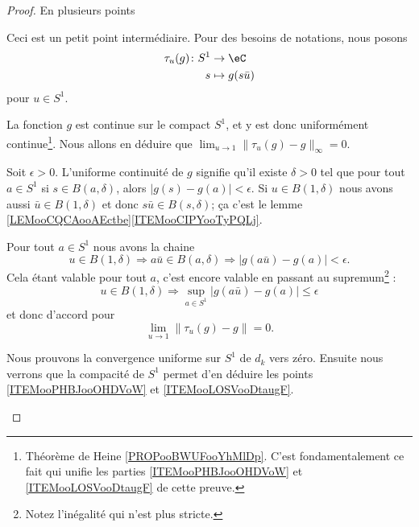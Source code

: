 \begin{proof}

	En plusieurs points
	\begin{subproof}

		\spitem[\( \lim_{u\to 1} \| \tau_u(g)-g \|=0\)]
		Ceci est un petit point intermédiaire. Pour des besoins de notations, nous posons
		\begin{equation}
			\begin{aligned}
				\tau_u(g)\colon S^1 & \to \eC            \\
				s                   & \mapsto g(s\bar u)
			\end{aligned}
		\end{equation}
		pour \( u\in S^1\).

		La fonction \( g\) est continue sur le compact \( S^1\), et y est donc uniformément continue\footnote{Théorème de Heine \ref{PROPooBWUFooYhMlDp}. C'est fondamentalement ce fait qui unifie les parties \ref{ITEMooPHBJooOHDVoW} et \ref{ITEMooLOSVooDtaugF} de cette preuve.}. Nous allons en déduire que \( \lim_{u\to 1} \| \tau_u(g)-g \|_{\infty}=0\).

		Soit \( \epsilon>0\). L'uniforme continuité de \( g\) signifie qu'il existe \( \delta>0\) tel que pour tout \( a\in S^1\) si \( s\in B(a,\delta)\), alors \( \big| g(s)-g(a) \big|<\epsilon\). Si \( u\in B(1,\delta)\) nous avons aussi \( \bar u\in B(1,\delta)\) et donc \( s\bar u\in B(s,\delta)\); ça c'est le lemme \ref{LEMooCQCAooAEctbe}\ref{ITEMooCIPYooTyPQLj}.

		Pour tout \( a\in S^1\) nous avons la chaine
		\begin{equation}
			u\in B(1,\delta)\Rightarrow a\bar u\in B(a,\delta)\Rightarrow \big| g(a\bar u)-g(a) \big|<\epsilon.
		\end{equation}
		Cela étant valable pour tout \( a\), c'est encore valable en passant au supremum\footnote{Notez l'inégalité qui n'est plus stricte.} :
		\begin{equation}
			u\in B(1,\delta)\Rightarrow\sup_{a\in S^1}\big| g(a\bar u)-g(a) \big|\leq\epsilon
		\end{equation}
		et donc d'accord pour
		\begin{equation}
			\lim_{u\to 1} \| \tau_u(g)-g \|=0.
		\end{equation}

		\spitem[\( \| d_k \|_{\infty}\to 0\)]
		Nous prouvons la convergence uniforme sur \( S^1\) de \( d_k\) vers zéro. Ensuite nous verrons que la compacité de \( S^1\) permet d'en déduire les points \ref{ITEMooPHBJooOHDVoW} et \ref{ITEMooLOSVooDtaugF}.


\end{subproof}
\end{proof}

